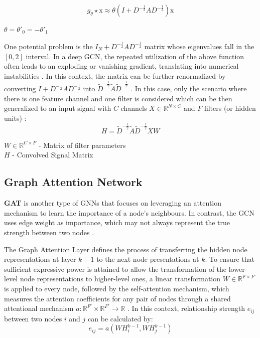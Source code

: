 \begin{equation} \label{eq:gcn-reduced-param}
	g_\theta \star \text{x} \approx \theta (I + D^{-\frac{1}{2}} AD^{-\frac{1}{2}}) \text{x}
\end{equation}

$\theta = \theta'_0 = - \theta'_1$

One potential problem is the $I_N + D^{-\frac{1}{2}} AD^{-\frac{1}{2}}$ matrix whose eigenvalues fall in the $[0,2]$ interval. In a deep GCN, the repeated utilization of the above function often leads to an exploding or vanishing gradient, translating into numerical instabilities \cite{liuIntroductionGraphNeural2020, tangGraphNeuralNetworks2022}. In this context, the matrix can be further renormalized by converting $I + D^{-\frac{1}{2}} AD^{-\frac{1}{2}}$ into $\tilde{D}^{-\frac{1}{2}} \tilde{A}\tilde{D}^{-\frac{1}{2}}$ \cite{liuIntroductionGraphNeural2020, tangGraphNeuralNetworks2022}. 
In this case, only the scenario where there is one feature channel and one filter is considered which can be then generalized to an input signal with $C$ channels $X \in \mathbb{R}^{N \times C}$ and $F$ filters (or hidden units) \cite{liuIntroductionGraphNeural2020, tangGraphNeuralNetworks2022}:
\begin{equation}
	H = \tilde{D}^{-\frac{1}{2}} \tilde{A}\tilde{D}^{-\frac{1}{2}}XW    
\end{equation}

$W \in \mathbb{R}^{C \times F}$ - Matrix of filter parameters \\
$H$ - Convolved Signal Matrix \\


\subsection{Graph Attention Network}

\textbf{\ac{GAT}} \cite{velickovicGraphAttentionNetworks2018} is another type of \acp{GNN} that focuses on leveraging an attention mechanism to learn the importance of a node's neighbours. In contrast, the \ac{GCN} uses edge weight as importance, which may not always represent the true strength between two nodes \cite{tangGraphNeuralNetworks2022, velickovicGraphAttentionNetworks2018}.

The Graph Attention Layer defines the process of transferring the hidden node representations at layer $k - 1$ to the next node presentations at $k$. To ensure that sufficient expressive power is attained to allow the transformation of the lower-level node representations to higher-level ones, a linear transformation $W \in \mathbb{R}^{F \times F'}$ is applied to every node, followed by the self-attention mechanism, which measures the attention coefficients for any pair of nodes through a shared attentional mechanism $a: \mathbb{R}^{F'} \times \mathbb{R}^{F'} \rightarrow \mathbb{R}$ \cite{tangGraphNeuralNetworks2022, velickovicGraphAttentionNetworks2018}. In this context, relationship strength $e_{ij}$ between two nodes $i$ and $j$ can be calculated by:
\begin{equation}
	e_{ij} = a(W H^{k - 1}_i, W H^{k - 1}_j)
\end{equation}

